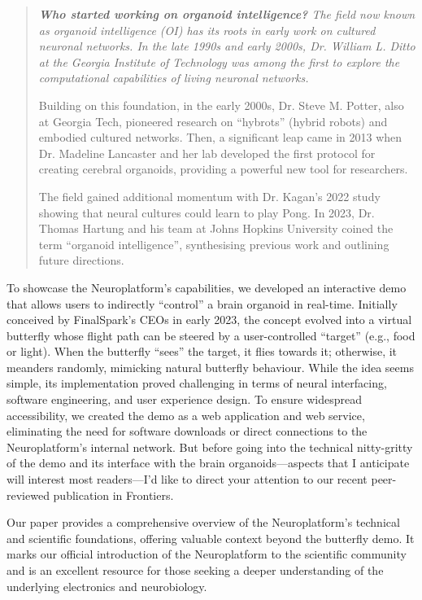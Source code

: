 \documentclass[10pt]{article}
\begin{document}
\begin{sloppypar}
  \begin{quote}
    \itshape
    \textbf{Who started working on organoid intelligence?}
    The field now known as organoid intelligence (OI) has its roots in early work on cultured neuronal networks. In the late 1990s and early 2000s, Dr. William L. Ditto at the Georgia Institute of Technology was among the first to explore the computational capabilities of living neuronal networks.

    Building on this foundation, in the early 2000s, Dr. Steve M. Potter, also at Georgia Tech, pioneered research on “hybrots” (hybrid robots) and embodied cultured networks. Then, a significant leap came in 2013 when Dr. Madeline Lancaster and her lab developed the first protocol for creating cerebral organoids, providing a powerful new tool for researchers.

    The field gained additional momentum with Dr. Kagan’s 2022 study showing that neural cultures could learn to play Pong. In 2023, Dr. Thomas Hartung and his team at Johns Hopkins University coined the term “organoid intelligence”, synthesising previous work and outlining future directions.
  \end{quote}

  To showcase the Neuroplatform’s capabilities, we developed an interactive demo that allows users to indirectly “control” a brain organoid in real-time. Initially conceived by FinalSpark’s CEOs in early 2023, the concept evolved into a virtual butterfly whose flight path can be steered by a user-controlled “target” (e.g., food or light). When the butterfly “sees” the target, it flies towards it; otherwise, it meanders randomly, mimicking natural butterfly behaviour. While the idea seems simple, its implementation proved challenging in terms of neural interfacing, software engineering, and user experience design. To ensure widespread accessibility, we created the demo as a web application and web service, eliminating the need for software downloads or direct connections to the Neuroplatform’s internal network. But before going into the technical nitty-gritty of the demo and its interface with the brain organoids—aspects that I anticipate will interest most readers—I’d like to direct your attention to our recent peer-reviewed publication in Frontiers.

  Our paper provides a comprehensive overview of the Neuroplatform’s technical and scientific foundations, offering valuable context beyond the butterfly demo. It marks our official introduction of the Neuroplatform to the scientific community and is an excellent resource for those seeking a deeper understanding of the underlying electronics and neurobiology.


  \pagebreak
  
  
  \nocite{*}

\end{sloppypar}
\end{document}
